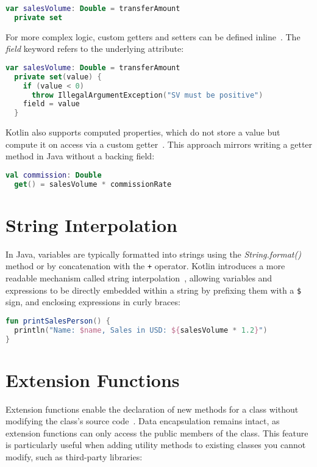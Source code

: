 \documentclass[a4paper,11pt]{article}
\begin{document}
\begin{lstlisting}[language=Kotlin, title={Private setter}]
var salesVolume: Double = transferAmount
  private set
\end{lstlisting}

For more complex logic, custom getters and setters can be defined inline~\cite{properties-getters-setters}. The \textit{field} keyword refers to the underlying attribute:

\begin{lstlisting}[language=Kotlin, title={Custom accessors}]
var salesVolume: Double = transferAmount
  private set(value) {
    if (value < 0)
      throw IllegalArgumentException("SV must be positive")
    field = value
  }
\end{lstlisting}

Kotlin also supports computed properties, which do not store a value but compute it on access via a custom getter~\cite{properties-getters-setters}. This approach mirrors writing a getter method in Java without a backing field:

\begin{lstlisting}[language=Kotlin, title={Computed Property}]
val commission: Double
  get() = salesVolume * commissionRate
\end{lstlisting}

\section{String Interpolation}
In Java, variables are typically formatted into strings using the \textit{String.format()} method or by concatenation with the \texttt{+} operator. Kotlin introduces a more readable mechanism called string interpolation~\cite{string-concatenation}, allowing variables and expressions to be directly embedded within a string by prefixing them with a \texttt{\$} sign, and enclosing expressions in curly braces:

\begin{lstlisting}[language=Kotlin, title={String Interpolation}]
fun printSalesPerson() {
  println("Name: $name, Sales in USD: ${salesVolume * 1.2}")
}
\end{lstlisting}

\section{Extension Functions}\label{sec:extension-functions}
Extension functions enable the declaration of new methods for a class without modifying the class's source code~\cite{extensions}.
Data encapsulation remains intact, as extension functions can only access the public members of the class.
This feature is particularly useful when adding utility methods to existing classes you cannot modify, such as third-party libraries:
\end{document}
